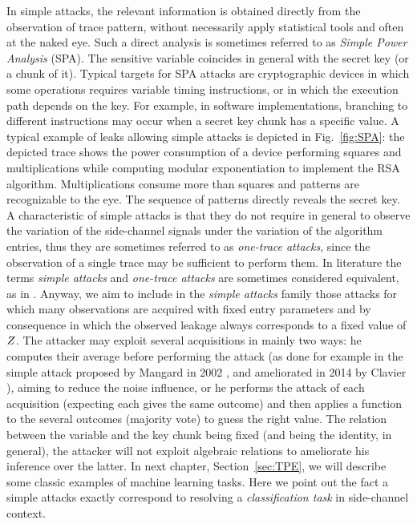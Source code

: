 In simple attacks, the relevant information is obtained directly from the observation of trace pattern, without necessarily apply statistical tools and often at the naked eye. Such a direct analysis is sometimes referred to as \emph{Simple Power Analysis} (SPA). The sensitive variable coincides in general with the secret key (or a chunk of it). Typical targets for SPA attacks are cryptographic devices in which some operations requires variable timing instructions, or in which the execution path depends on the key. For example, in software implementations, branching to different instructions may occur when a secret key chunk has a specific value. A typical example of leaks allowing simple attacks is depicted in Fig.~\ref{fig:SPA}: the depicted trace shows the power consumption of a device performing squares and multiplications while computing modular exponentiation to implement the RSA algorithm. Multiplications consume more than squares and patterns are recognizable to the eye. The sequence of patterns directly reveals the secret key. A characteristic of simple attacks is that they do not require in general to observe the variation of the side-channel signals under the variation of the algorithm entries, thus they are sometimes referred to as \emph{one-trace attacks}, since the observation of a single trace may be sufficient to perform them. In literature the terms \emph{simple attacks} and \emph{one-trace attacks} are sometimes considered equivalent, as \eg in \cite{exponent2012rosetta}. Anyway, we aim to include in the \emph{simple attacks} family those attacks for which many observations are acquired with fixed entry parameters and by consequence in which the observed leakage always corresponds to a fixed value of $Z$. The attacker may exploit several acquisitions in mainly two ways: he computes their average before performing the attack (as done for example in the simple attack proposed by Mangard in 2002 \cite{mangard2002simple}, and ameliorated in 2014 by Clavier \etal \cite{clavier2014simple}), aiming to reduce the noise influence, or he performs the attack of each acquisition (expecting each gives the same outcome) and then applies a function to the several outcomes (\eg majority vote) to guess the right value. The relation between the variable and the key chunk being fixed (and being the identity, in general), the attacker will not exploit algebraic relations to ameliorate his inference over the latter. In next chapter, Section~\ref{sec:TPE}, we will describe some classic examples of machine learning tasks. Here we point out the fact a simple attacks exactly correspond to resolving a \emph{classification task} in side-channel context. 


